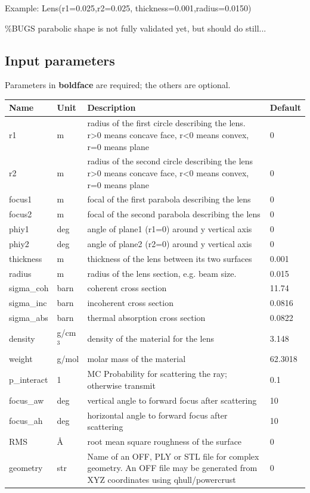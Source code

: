 Example: Lens(r1=0.025,r2=0.025, thickness=0.001,radius=0.0150)

\%BUGS parabolic shape is not fully validated yet, but should do still...

\subsection*{Input parameters}
Parameters in \textbf{boldface} are required; the others are optional.

\begin{longtable}{p{}p{}p{}p{}}
\toprule
\textbf{Name} & \textbf{Unit} & \textbf{Description} & \textbf{Default} \\
\midrule
\endhead
r1 & m & radius of the first circle describing the lens. r\textgreater{}0 means concave face, r\textless{}0 means convex, r=0 means plane & 0 \\
r2 & m & radius of the second circle describing the lens r\textgreater{}0 means concave face, r\textless{}0 means convex, r=0 means plane & 0 \\
focus1 & m & focal of the first parabola describing the lens & 0 \\
focus2 & m & focal of the second parabola describing the lens & 0 \\
phiy1 & deg & angle of plane1 (r1=0) around y vertical axis & 0 \\
phiy2 & deg & angle of plane2 (r2=0) around y vertical axis & 0 \\
thickness & m & thickness of the lens between its two  surfaces & 0.001 \\
radius & m & radius of the lens section, e.g. beam size. & 0.015 \\
sigma\_coh & barn & coherent cross section & 11.74 \\
sigma\_inc & barn & incoherent cross section & 0.0816 \\
sigma\_abs & barn & thermal absorption cross section & 0.0822 \\
density & g/cm$^{3}$ & density of the material for the lens & 3.148 \\
weight & g/mol & molar mass of the material & 62.3018 \\
p\_interact & 1 & MC Probability for scattering the ray; otherwise transmit & 0.1 \\
focus\_aw & deg & vertical angle to forward focus after scattering & 10 \\
focus\_ah & deg & horizontal angle to forward focus after scattering & 10 \\
RMS & \AA{} & root mean square roughness of the surface & 0 \\
geometry & str & Name of an OFF, PLY or STL file for complex geometry. An OFF file may be generated from XYZ coordinates using qhull/powercrust & 0 \\
\bottomrule
\end{longtable}

